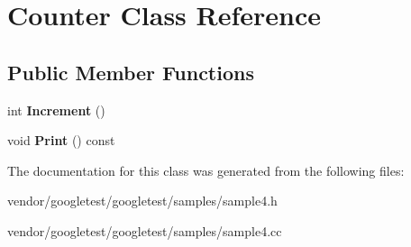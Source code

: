 \hypertarget{class_counter}{}\section{Counter Class Reference}
\label{class_counter}
\subsection*{Public Member Functions}
\begin{DoxyCompactItemize}
\item 
\mbox{\label{class_counter_a0a0ca9fdb580a2aec9a5a62ebed2b5ab}} 
int {\bfseries Increment} ()
\item 
\mbox{\label{class_counter_a80092ec2a0deea0870b2e9f8ad0906bd}} 
void {\bfseries Print} () const
\end{DoxyCompactItemize}


The documentation for this class was generated from the following files\+:\begin{DoxyCompactItemize}
\item 
vendor/googletest/googletest/samples/sample4.\+h\item 
vendor/googletest/googletest/samples/sample4.\+cc\end{DoxyCompactItemize}
